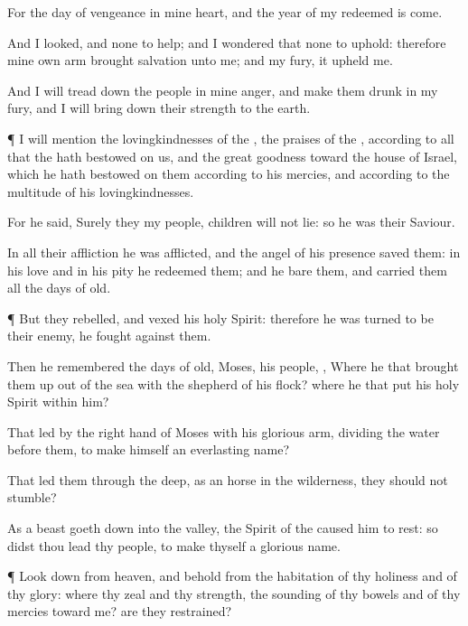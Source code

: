 {For the
day of
vengeance
{} in mine
heart, and the
year of my
redeemed is
come.

And I
looked, and
{} none to
help; and I
wondered that
{} none to
uphold: therefore mine own
arm brought
salvation unto me; and my
fury, it
upheld me.

And I will tread
down the
people in mine
anger, and make them
drunk in my
fury, and I will bring
down their
strength to the
earth.


\par }{\PP {}¶ I will
mention the
lovingkindnesses of the
{},
{} the
praises of the
{}, according to all that the
{} hath
bestowed on us, and the
great
goodness toward the
house of
Israel, which he hath
bestowed on them according to his
mercies, and according to the
multitude of his
lovingkindnesses.

For he
said, Surely they
{} my
people,
children
{} will not
lie: so he was their
Saviour.

In all their
affliction he was
afflicted, and the
angel of his
presence
saved them: in his
love and in his
pity he
redeemed them; and he
bare them, and
carried them all the
days of
old.


\par }{\PP {}¶ But they
rebelled, and
vexed his
holy
Spirit: therefore he was
turned to be their
enemy,
{} he
fought against them.

Then he
remembered the
days of
old,
Moses,
{} his
people,
{}, Where
{} he that brought them
up out of the
sea with the
shepherd of his
flock? where
{} he that
put his
holy
Spirit
within him?

That
led
{} by the right
hand of
Moses with his
glorious
arm,
dividing the
water
before them, to
make himself an
everlasting
name?

That
led them through the
deep, as an
horse in the
wilderness,
{} they should not
stumble?

As a
beast goeth
down into the
valley, the
Spirit of the
{} caused him to
rest: so didst thou
lead thy
people, to
make thyself a
glorious
name.


\par }{\PP {}¶ Look
down from
heaven, and
behold from the
habitation of thy
holiness and of thy
glory: where
{} thy
zeal and thy
strength, the
sounding of thy
bowels and of thy
mercies toward me? are they
restrained?

}
